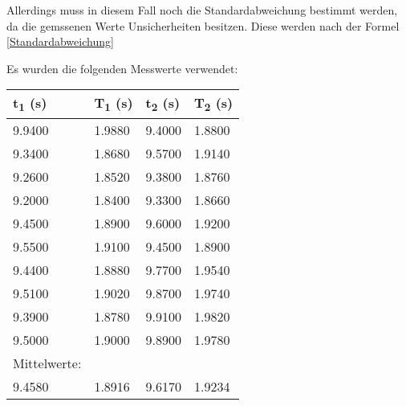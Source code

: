 \documentclass[titlepage=firstcover, captions=tableheading]{scrartcl}
\begin{document}
Allerdings muss in diesem Fall noch die Standardabweichung bestimmt werden, da die gemssenen Werte Unsicherheiten besitzen.
Diese werden nach der Formel \ref{Standardabweichung}


Es wurden die folgenden Messwerte verwendet: 

\begin{minipage}{\linewidth}
    \centering
{}
\begin{tabular}{llll}
    \toprule
    t\textsubscript{1} (s) & T\textsubscript{1} (s) & t\textsubscript{2} (s) & T\textsubscript{2} (s) \\
    \midrule
    9.9400  &    1.9880  & 9.4000 & 1.8800 \\
    9.3400  &    1.8680  & 9.5700 & 1.9140 \\
    9.2600  &    1.8520  & 9.3800 & 1.8760 \\
    9.2000  &    1.8400  & 9.3300 & 1.8660 \\
    9.4500  &    1.8900  & 9.6000 & 1.9200 \\
    9.5500  &    1.9100  & 9.4500 & 1.8900 \\
    9.4400  &    1.8880  & 9.7700 & 1.9540 \\
    9.5100  &    1.9020  & 9.8700 & 1.9740 \\
    9.3900  &    1.8780  & 9.9100 & 1.9820 \\
    9.5000  &    1.9000  & 9.8900 & 1.9780 \\
    \midrule
    Mittelwerte:\\
    9.4580 & 1.8916 & 9.6170 & 1.9234  \\
    \bottomrule
    
\end{tabular}
\label{tab:1}
\leavevmode
\newline
\vspace*{1 cm}
\newline
\end{minipage}
\end{document}
